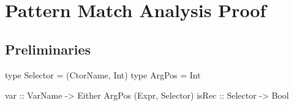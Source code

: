 




\newcommand{\rec}[1]{\hspace{-0.75ex}_{#1}}


\newcommand{\para}[1]{\vspace{2mm}\noindent\textbf{#1}}


\chapter{Pattern Match Analysis Proof}

\section{Preliminaries}

\begin{code}
type Selector  =  (CtorName, Int)
type ArgPos    =  Int

var    :: VarName   -> Either ArgPos (Expr, Selector)
isRec  :: Selector  -> Bool
\end{code}

